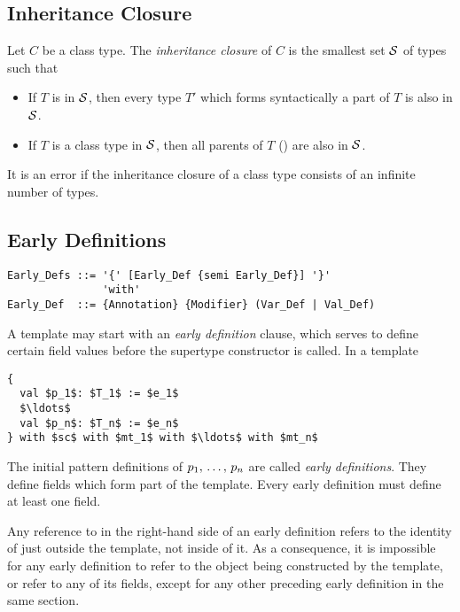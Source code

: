 \subsection{Inheritance Closure}
\label{sec:inheritance-closure}

\newcommand{\inheritclosure}{{\cal S}}

Let $C$ be a class type. The {\em inheritance closure} of $C$ is the smallest set $\inheritclosure$ of types such that
\begin{itemize}
\item If $T$ is in $\inheritclosure$, then every type $T'$ which forms syntactically a part of $T$ is also in $\inheritclosure$. 
\item If $T$ is a class type in $\inheritclosure$, then all parents of $T$ () are also in $\inheritclosure$. 
\end{itemize}
It is an error if the inheritance closure of a class type consists of an infinite number of types. 






\subsection{Early Definitions}
\label{sec:early-defs}

\grammar\begin{lstlisting}
Early_Defs ::= '{' [Early_Def {semi Early_Def}] '}' 
               'with'
Early_Def  ::= {Annotation} {Modifier} (Var_Def | Val_Def)
\end{lstlisting}

A template may start with an {\em early definition} clause, which serves to define certain field values before the supertype constructor is called. In a template
\begin{lstlisting}
{
  val $p_1$: $T_1$ := $e_1$
  $\ldots$
  val $p_n$: $T_n$ := $e_n$
} with $sc$ with $mt_1$ with $\ldots$ with $mt_n$
\end{lstlisting}
The initial pattern definitions of $p_1 ,\, \ldots ,\, p_n$ are called {\em early definitions}. They define fields which form part of the template. Every early definition must define at least one field. 

Any reference to  in the right-hand side of an early definition refers to the identity of  just outside the template, not inside of it. As a consequence, it is impossible for any early definition to refer to the object being constructed by the template, or refer to any of its fields, except for any other preceding early definition in the same section. 








